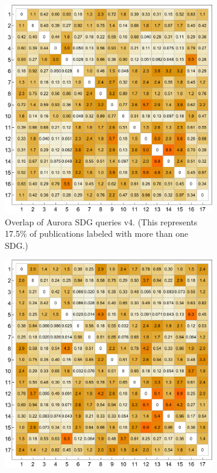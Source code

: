 \documentclass{article}
\begin{document}
\begin{figure}[H]
    \centering
    \begin{subfigure}{0.49\textwidth}
        \centering
        \includegraphics[width=\textwidth]{figures/heatmapv4.pdf}
	    \caption{Overlap of Aurora SDG queries v4. (This represents 17.5\% of publications labeled with more than one SDG.)}
	    \label{heatmapoverlapv4}
    \end{subfigure}
    \hfill
    \begin{subfigure}{0.49\textwidth}
        \centering
        \includegraphics[width=\textwidth]{figures/heatmapv5.pdf}

\end{subfigure}
\end{figure}
\end{document}
